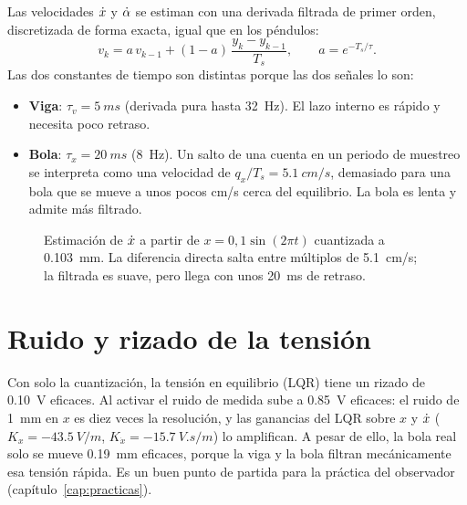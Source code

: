 Las velocidades $\dot{x}$ y $\dot{\alpha}$ se estiman con una derivada filtrada de primer orden, discretizada de forma exacta, igual que en los péndulos:
\begin{equation}
  v_k = a\,v_{k-1} + (1-a)\,\frac{y_k-y_{k-1}}{T_s},\qquad a = e^{-T_s/\tau}.
\end{equation}
Las dos constantes de tiempo son distintas porque las dos señales lo son:
\begin{itemize}
  \item \textbf{Viga}: $\tau_v=\SI{5}{ms}$ (derivada pura hasta \SI{32}{Hz}). El lazo interno es rápido y necesita poco retraso.
  \item \textbf{Bola}: $\tau_x=\SI{20}{ms}$ (\SI{8}{Hz}). Un salto de una cuenta en un periodo de muestreo se interpreta como una velocidad de $q_x/T_s=\SI{5.1}{cm/s}$, demasiado para una bola que se mueve a unos pocos cm/s cerca del equilibrio. La bola es lenta y admite más filtrado.
\end{itemize}

\begin{figure}[H]
\centering
{}
\caption{Estimación de $\dot{x}$ a partir de $x=0{,}1\sin(2\pi t)$ cuantizada a \SI{0.103}{mm}. La diferencia directa salta entre múltiplos de \SI{5.1}{cm/s}; la filtrada es suave, pero llega con unos \SI{20}{ms} de retraso.}
\label{fig:velest}
\end{figure}

\section{Ruido y rizado de la tensión}

Con solo la cuantización, la tensión en equilibrio (LQR) tiene un rizado de \SI{0.10}{V} eficaces. Al activar el ruido de medida sube a \SI{0.85}{V} eficaces: el ruido de \SI{1}{mm} en $x$ es diez veces la resolución, y las ganancias del LQR sobre $x$ y $\dot{x}$ ($K_x=\SI{-43.5}{V/m}$, $K_{\dot x}=\SI{-15.7}{V.s/m}$) lo amplifican. A pesar de ello, la bola real solo se mueve \SI{0.19}{mm} eficaces, porque la viga y la bola filtran mecánicamente esa tensión rápida. Es un buen punto de partida para la práctica del observador (capítulo~\ref{cap:practicas}).
